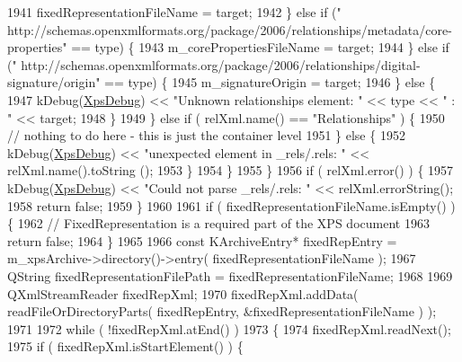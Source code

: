 \begin{DoxyCode}
1941                     fixedRepresentationFileName = target;
1942                 \} \textcolor{keywordflow}{else} \textcolor{keywordflow}{if} (\textcolor{stringliteral}{"
      http://schemas.openxmlformats.org/package/2006/relationships/metadata/core-properties"} == type) \{
1943                     m\_corePropertiesFileName = target;
1944                 \} \textcolor{keywordflow}{else} \textcolor{keywordflow}{if} (\textcolor{stringliteral}{"
      http://schemas.openxmlformats.org/package/2006/relationships/digital-signature/origin"} == type) \{
1945                     m\_signatureOrigin = target;
1946                 \} \textcolor{keywordflow}{else} \{
1947                     kDebug(\hyperlink{generator__xps_8cpp_a00c0825a8bf77ed142d9a5a205d66f3c}{XpsDebug}) << \textcolor{stringliteral}{"Unknown relationships element: "} << type << \textcolor{stringliteral}{" : "} << 
      target;
1948                 \}
1949             \} \textcolor{keywordflow}{else} \textcolor{keywordflow}{if} ( relXml.name() == \textcolor{stringliteral}{"Relationships"} ) \{
1950                 \textcolor{comment}{// nothing to do here - this is just the container level}
1951             \} \textcolor{keywordflow}{else} \{
1952                 kDebug(\hyperlink{generator__xps_8cpp_a00c0825a8bf77ed142d9a5a205d66f3c}{XpsDebug}) << \textcolor{stringliteral}{"unexpected element in \_rels/.rels: "} << relXml.name().toString
      ();
1953             \}
1954         \}
1955     \}
1956     \textcolor{keywordflow}{if} ( relXml.error() ) \{
1957         kDebug(\hyperlink{generator__xps_8cpp_a00c0825a8bf77ed142d9a5a205d66f3c}{XpsDebug}) << \textcolor{stringliteral}{"Could not parse \_rels/.rels: "} << relXml.errorString();
1958         \textcolor{keywordflow}{return} \textcolor{keyword}{false};
1959     \}
1960 
1961     \textcolor{keywordflow}{if} ( fixedRepresentationFileName.isEmpty() ) \{
1962         \textcolor{comment}{// FixedRepresentation is a required part of the XPS document}
1963         \textcolor{keywordflow}{return} \textcolor{keyword}{false};
1964     \}
1965 
1966     \textcolor{keyword}{const} KArchiveEntry* fixedRepEntry = m\_xpsArchive->directory()->entry( fixedRepresentationFileName );
1967     QString fixedRepresentationFilePath = fixedRepresentationFileName;
1968 
1969     QXmlStreamReader fixedRepXml;
1970     fixedRepXml.addData( readFileOrDirectoryParts( fixedRepEntry, &fixedRepresentationFileName ) );
1971 
1972     \textcolor{keywordflow}{while} ( !fixedRepXml.atEnd() )
1973     \{
1974         fixedRepXml.readNext();
1975         \textcolor{keywordflow}{if} ( fixedRepXml.isStartElement() ) \{

\end{DoxyCode}
